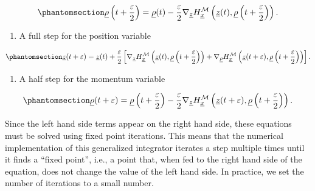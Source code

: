 \documentclass[
]{scrartcl}
\providecommand{\tightlist}{%
  \setlength{\itemsep}{0pt}\setlength{\parskip}{0pt}}\usepackage{longtable,booktabs,array}
\begin{document}
\begin{refsection}
\begin{equation}\phantomsection\label{eq-generalized-leapfrog-momentum-half-step}{
\underline{\rho}\left(t+\frac{\varepsilon}{2}\right) = 
\underline{\rho}(t) - 
\frac{\varepsilon}{2} 
\nabla_{\underline{z}} H_{\underline{x}}^{\mathcal{M}}\left(
    \underline{z}(t), 
    \underline{\rho}\left(t+\frac{\varepsilon}{2}\right)
\right).
}\end{equation}

\begin{enumerate}
\def\labelenumi{\arabic{enumi}.}
\setcounter{enumi}{1}
\tightlist
\item
  A full step for the position variable
\end{enumerate}

\begin{equation}\phantomsection\label{eq-generalized-leapfrog-position-full-step}{
\underline{z}(t+\varepsilon) = 
\underline{z}(t) + 
\frac{\varepsilon}{2}
\left[
    \nabla_{\underline{z}} H_{\underline{x}}^{\mathcal{M}}\left(
        \underline{z}(t), 
        \underline{\rho}\left(t+\frac{\varepsilon}{2}\right)
    \right) +
    \nabla_{\underline{\rho}} H_{\underline{x}}^{\mathcal{M}}\left(
        \underline{z}(t+\varepsilon), 
        \underline{\rho}\left(t+\frac{\varepsilon}{2}\right)
    \right)
\right].
}\end{equation}

\begin{enumerate}
\def\labelenumi{\arabic{enumi}.}
\setcounter{enumi}{2}
\tightlist
\item
  A half step for the momentum variable
\end{enumerate}

\begin{equation}\phantomsection\label{eq-generalized-leapfrog-momentum-full-step}{
\underline{\rho}(t+\varepsilon) = 
\underline{\rho}\left(t+\frac{\varepsilon}{2}\right) - 
\frac{\varepsilon}{2} 
\nabla_{\underline{z}} H_{\underline{x}}^{\mathcal{M}}\left(
    \underline{z}(t+\varepsilon), 
    \underline{\rho}\left(t+\frac{\varepsilon}{2}\right)
\right).
}\end{equation}

Since the left hand side terms appear on the right hand side, these
equations must be solved using fixed point iterations. This means that
the numerical implementation of this generalized integrator iterates a
step multiple times until it finds a ``fixed point'', i.e., a point
that, when fed to the right hand side of the equation, does not change
the value of the left hand side. In practice, we set the number of
iterations to a small number.


\end{refsection}
\end{document}
